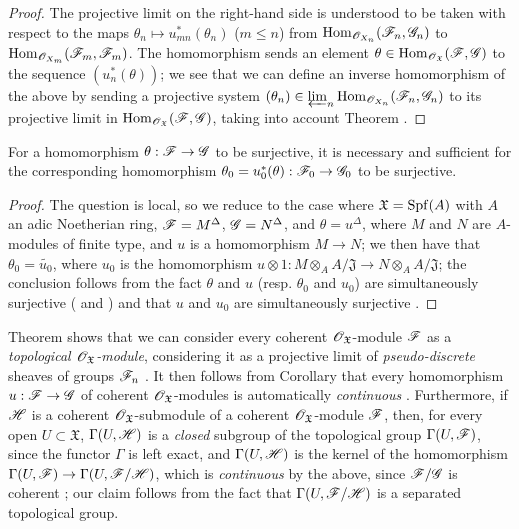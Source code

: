 \begin{proof}
The projective limit on the right-hand side is understood to be taken with respect to the maps $\theta_n\mapsto u_{mn}^*(\theta_n)$ ($m\leq n$) from $\operatorname{Hom}_{\mathscr{O}_{X_n}}(\mathscr{F}_n,\mathscr{G}_n)$ to $\operatorname{Hom}_{\mathscr{O}_{X_m}}(\mathscr{F}_m,\mathscr{F}_m)$.
The homomorphism  sends an element $\theta\in\operatorname{Hom}_{\mathscr{O}_\mathfrak{X}}(\mathscr{F},\mathscr{G})$ to the sequence $(u_n^*(\theta))$; we see that we can define an inverse homomorphism of the above by sending a projective system $(\theta_n)\in\varprojlim_n\operatorname{Hom}_{\mathscr{O}_{X_n}}(\mathscr{F}_n,\mathscr{G}_n)$ to its projective limit in $\operatorname{Hom}_{\mathscr{O}_\mathfrak{X}}(\mathscr{F},\mathscr{G})$, taking into account Theorem .
\end{proof}

\begin{corollary}[10.11.5]
\label{I.10.11.5}
For a homomorphism $\theta:\sh{F}\to\sh{G}$ to be surjective, it is necessary and sufficient for the corresponding homomorphism $\theta_0=u_0^*(\theta):\sh{F}_0\to\sh{G}_0$ to be surjective.
\end{corollary}

\begin{proof}
The question is local, so we reduce to the case where $\mathfrak{X}=\operatorname{Spf}(A)$ with $A$ an adic Noetherian ring, $\mathscr{F}=M^\Delta$, $\mathscr{G}=N^\Delta$, and $\theta=u^\Delta$, where $M$ and $N$ are $A$-modules of finite type, and $u$ is a homomorphism $M\to N$; we then have that $\theta_0=\widetilde{u_0}$, where $u_0$ is the homomorphism $u\otimes 1:M\otimes_A A/\mathfrak{J}\to N\otimes_A A/\mathfrak{J}$; the conclusion follows from the fact $\theta$ and $u$ (resp. $\theta_0$ and $u_0$) are simultaneously surjective ( and ) and that $u$ and $u_0$ are simultaneously surjective .
\end{proof}

\begin{env}[10.11.6]
\label{I.10.11.6}
Theorem  shows that we can consider every coherent $\mathscr{O}_\mathfrak{X}$-module $\mathscr{F}$ as a \emph{topological $\mathscr{O}_\mathfrak{X}$-module}, considering it as a projective limit of \emph{pseudo-discrete} sheaves of groups $\mathscr{F}_n$ .
It then follows from Corollary  that every homomorphism $u:\sh{F}\to\sh{G}$ of coherent $\mathscr{O}_\mathfrak{X}$-modules is automatically \emph{continuous}
.
Furthermore, if $\mathscr{H}$ is a coherent $\mathscr{O}_\mathfrak{X}$-submodule of a coherent $\mathscr{O}_\mathfrak{X}$-module $\mathscr{F}$, then, for every open $U\subset\mathfrak{X}$, $\Gamma(U,\mathscr{H})$ is a \emph{closed} subgroup of the topological group $\Gamma(U,\mathscr{F})$, since the functor $\Gamma$ is left exact, and $\Gamma(U,\mathscr{H})$ is the kernel of the homomorphism $\Gamma(U,\sh{F})\to\Gamma(U,\sh{F}/\sh{H})$, which is \emph{continuous} by the above, since $\mathscr{F}/\mathscr{G}$ is coherent ; our claim follows from the fact that $\Gamma(U,\mathscr{F}/\mathscr{H})$ is a separated topological group.
\end{env}

